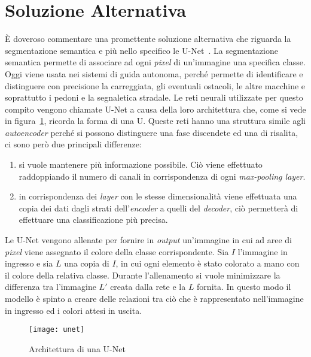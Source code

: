 \section{Soluzione Alternativa}
È doveroso commentare una promettente soluzione alternativa che riguarda la segmentazione semantica e più nello specifico le U-Net~\cite{unet}.
La segmentazione semantica permette di associare ad ogni \textit{pixel} di un'immagine una specifica classe.
Oggi viene usata nei sistemi di guida autonoma, perché permette di identificare e distinguere con precisione la carreggiata, gli eventuali ostacoli, le altre macchine e soprattutto i pedoni e la segnaletica stradale.
Le reti neurali utilizzate per questo compito vengono chiamate U-Net a causa della loro architettura che, come si vede in figura~\ref{fig:unet}, ricorda la forma di una U.
Queste reti hanno una struttura simile agli \textit{autoencoder} perché si possono distinguere una fase discendete ed una di risalita, ci sono però due principali differenze:
\begin{enumerate}
  \item si vuole mantenere più informazione possibile.
    Ciò viene effettuato raddoppiando il numero di canali in corrispondenza di ogni \textit{max-pooling layer}.

  \item in corrispondenza dei \textit{layer} con le stesse dimensionalità viene effettuata una copia dei dati dagli strati dell'\textit{encoder} a quelli del \textit{decoder}, ciò permetterà di effettuare una classificazione più precisa.

\end{enumerate}
Le U-Net vengono allenate per fornire in \textit{output} un'immagine in cui ad aree di \textit{pixel} viene assegnato il colore della classe corrispondente.
Sia $I$ l'immagine in ingresso e sia $L$ una copia di $I$, in cui ogni elemento è stato colorato a mano con il colore della relativa classe.
Durante l'allenamento si vuole minimizzare la differenza tra l'immagine $L'$ creata dalla rete e la $L$ fornita.
In questo modo il modello è spinto a creare delle relazioni tra ciò che è rappresentato nell'immagine in ingresso ed i colori attesi in uscita.

\begin{figure}[ht]
  \begin{center}
    \texttt{[image: unet]}
    \caption{Architettura di una U-Net}
    \label{fig:unet}
  \end{center}
\end{figure}


